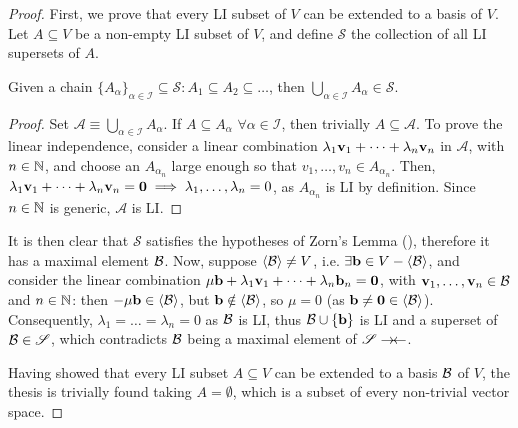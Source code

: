 \begin{proofbox}
  \begin{proof}
    First, we prove that every LI subset of $ V $ can be extended to a basis of $ V $. Let $ A \subseteq V $ be a non-empty LI subset of $ V $, and define $ \mathscr{S} $ the collection of all LI supersets of $ A $.

    \begin{lemma}{}{}
      Given a chain $ \{A_\alpha\}_{\alpha \in \mathcal{I}} \subseteq \mathscr{S} : A_1 \subseteq A_2 \subseteq \dots $, then $ \bigcup_{\alpha \in \mathcal{I}} A_\alpha \in \mathscr{S} $.
    \end{lemma}

    \begin{proofbox}
      \begin{proof}
        Set $ \mathcal{A} \equiv \bigcup_{\alpha \in \mathcal{I}} A_\alpha $. If $ A \subseteq A_\alpha \,\,\forall \alpha \in \mathcal{I} $, then trivially $ A \subseteq \mathcal{A} $. To prove the linear independence, consider a linear combination $ \lambda_1 \mathbf{v}_1 + \dots + \lambda_n \mathbf{v}_n $ in $ \mathcal{A} $, with $ n \in \mathbb{N} $, and choose an $ A_{\alpha_n} $ large enough so that $ v_1 , \dots , v_n \in A_{\alpha_n} $. Then, $ \lambda_1 \mathbf{v}_1 + \dots + \lambda_n \mathbf{v}_n = \mathbf{0} \implies \lambda_1 , \dots , \lambda_n = 0 $, as $ A_{\alpha_n} $ is LI by definition. Since $ n \in \mathbb{N} $ is generic, $ \mathcal{A} $ is LI.
      \end{proof}
    \end{proofbox}

    It is then clear that $ \mathscr{S} $ satisfies the hypotheses of Zorn's Lemma (), therefore it has a maximal element $ \mathcal{B} $. Now, suppose $ \braket{\mathcal{B}} \neq V $, i.e. $ \exists \mathbf{b} \in V - \braket{\mathcal{B}} $, and consider the linear combination $ \mu \mathbf{b} + \lambda_1 \mathbf{v}_1 + \dots + \lambda_n \mathbf{b}_n = \mathbf{0} $, with $ \mathbf{v}_1 , \dots , \mathbf{v}_n \in \mathcal{B} $ and $ n \in \mathbb{N} $: then $ - \mu \mathbf{b} \in \braket{\mathcal{B}} $, but $ \mathbf{b} \notin \braket{\mathcal{B}} $, so $ \mu = 0 $ (as $ \mathbf{b} \neq \mathbf{0} \in \braket{\mathcal{B}} $). Consequently, $ \lambda_1 = \dots = \lambda_n = 0 $ as $ \mathcal{B} $ is LI, thus $ \mathcal{B} \cup \{\mathbf{b}\} $ is LI and a superset of $ \mathcal{B} \in \mathscr{S} $, which contradicts $ \mathcal{B} $ being a maximal element of $ \mathscr{S} \rightarrow \hspace{-0.15em} \leftarrow $.

    Having showed that every LI subset $ A \subseteq V $ can be extended to a basis $ \mathcal{B} $ of $ V $, the thesis is trivially found taking $ A = \emptyset $, which is a subset of every non-trivial vector space.
  \end{proof}
\end{proofbox}

